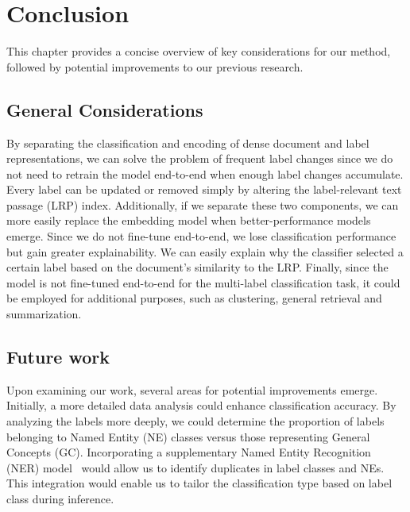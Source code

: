 % 
\chapter{Conclusion}
\label{ch:trends}
This chapter provides a concise overview of key considerations for our method, followed by potential improvements to our previous research.

\section{General Considerations}

By separating the classification and encoding of dense document and label representations, we can solve the problem of frequent label changes since we do not need to retrain the model end-to-end when enough label changes accumulate. 
Every label can be updated or removed simply by altering the label-relevant text passage (LRP) index.
Additionally, if we separate these two components, we can more easily replace the embedding model when better-performance models emerge.
Since we do not fine-tune end-to-end, we lose classification performance but gain greater explainability. 
We can easily explain why the classifier selected a certain label based on the document's similarity to the LRP.
Finally, since the model is not fine-tuned end-to-end for the multi-label classification task, it could be employed for additional purposes, such as clustering, general retrieval and summarization.

\section{Future work}

Upon examining our work, several areas for potential improvements emerge. 
Initially, a more detailed data analysis could enhance classification accuracy. 
By analyzing the labels more deeply, we could determine the proportion of labels belonging to Named Entity (NE) classes versus those representing General Concepts (GC). 
Incorporating a supplementary Named Entity Recognition (NER) model~\parencite{ivacic2023analysis} would allow us to identify duplicates in label classes and NEs. 
This integration would enable us to tailor the classification type based on label class during inference.

